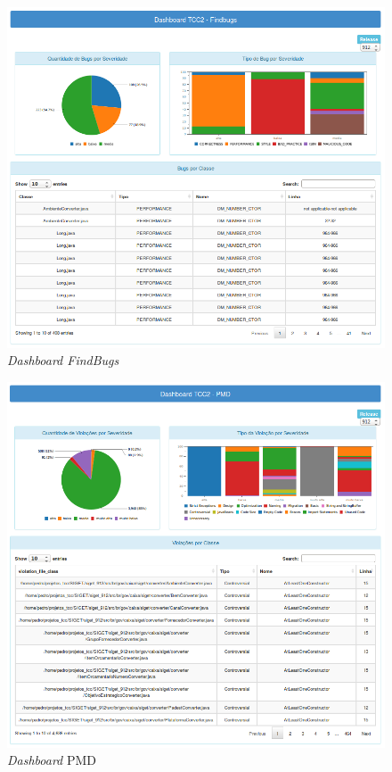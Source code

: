 \begin{apendicesenv}
\begin{figure}[H]
\centering
\includegraphics[keepaspectratio=false,scale=0.50]{figuras/figuras_nilton/DashboardFindbugs.png}
\caption{\textit{Dashboard FindBugs}}
\label{dashfindbugs}
\end{figure}

\begin{figure}[H]
\centering
\includegraphics[keepaspectratio=false,scale=0.50]{figuras/figuras_nilton/DashboardPMD}
\caption{\textit{Dashboard} PMD}
\label{dashpmd}
\end{figure}



\end{apendicesenv}
